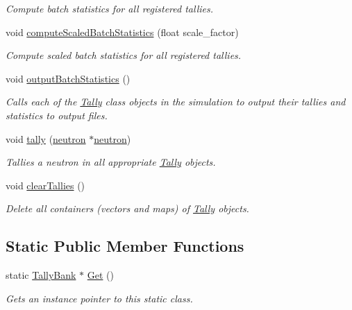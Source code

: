 \begin{DoxyCompactItemize}
\begin{DoxyCompactList}\small\item\em Compute batch statistics for all registered tallies. \end{DoxyCompactList}\item 
void \hyperlink{classTallyBank_a26bdf7c7f02b528c552ee44f0d014af1}{compute\-Scaled\-Batch\-Statistics} (float scale\-\_\-factor)
\begin{DoxyCompactList}\small\item\em Compute scaled batch statistics for all registered tallies. \end{DoxyCompactList}\item 
void \hyperlink{classTallyBank_abf05a2ab1390f0703cf550b1c312f191}{output\-Batch\-Statistics} ()
\begin{DoxyCompactList}\small\item\em Calls each of the \hyperlink{classTally}{Tally} class objects in the simulation to output their tallies and statistics to output files. \end{DoxyCompactList}\item 
void \hyperlink{classTallyBank_a929908afec2f18a4321b29beb52877f2}{tally} (\hyperlink{structneutron}{neutron} $\ast$\hyperlink{structneutron}{neutron})
\begin{DoxyCompactList}\small\item\em Tallies a neutron in all appropriate \hyperlink{classTally}{Tally} objects. \end{DoxyCompactList}\item 
\hypertarget{classTallyBank_a0e3309a94c772eedd2e0f6f4d6003f7d}{void \hyperlink{classTallyBank_a0e3309a94c772eedd2e0f6f4d6003f7d}{clear\-Tallies} ()}\label{classTallyBank_a0e3309a94c772eedd2e0f6f4d6003f7d}

\begin{DoxyCompactList}\small\item\em Delete all containers (vectors and maps) of \hyperlink{classTally}{Tally} objects. \end{DoxyCompactList}\end{DoxyCompactItemize}
\subsection*{Static Public Member Functions}
\begin{DoxyCompactItemize}
\item 
static \hyperlink{classTallyBank}{Tally\-Bank} $\ast$ \hyperlink{classTallyBank_aa1d0673d8b28528416e5862e30c63aa2}{Get} ()
\begin{DoxyCompactList}\small\item\em Gets an instance pointer to this static class. \end{DoxyCompactList}\end{DoxyCompactItemize}


